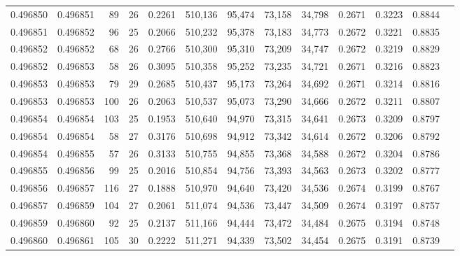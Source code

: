 \begin{tabular}{rrrrrrrrrrrrr}
0.496850 & 0.496851 &  89 &  26 &                                     0.2261 & 510,136 &  95,474 &  73,158 &  34,798 & 0.2671 & 0.3223 & 0.8844 \\
0.496851 & 0.496852 &  96 &  25 &                                     0.2066 & 510,232 &  95,378 &  73,183 &  34,773 & 0.2672 & 0.3221 & 0.8835 \\
0.496852 & 0.496852 &  68 &  26 &                                     0.2766 & 510,300 &  95,310 &  73,209 &  34,747 & 0.2672 & 0.3219 & 0.8829 \\
0.496852 & 0.496853 &  58 &  26 &                                     0.3095 & 510,358 &  95,252 &  73,235 &  34,721 & 0.2671 & 0.3216 & 0.8823 \\
0.496853 & 0.496853 &  79 &  29 &                                     0.2685 & 510,437 &  95,173 &  73,264 &  34,692 & 0.2671 & 0.3214 & 0.8816 \\
0.496853 & 0.496853 & 100 &  26 &                                     0.2063 & 510,537 &  95,073 &  73,290 &  34,666 & 0.2672 & 0.3211 & 0.8807 \\
0.496854 & 0.496854 & 103 &  25 &                                     0.1953 & 510,640 &  94,970 &  73,315 &  34,641 & 0.2673 & 0.3209 & 0.8797 \\
0.496854 & 0.496854 &  58 &  27 &                                     0.3176 & 510,698 &  94,912 &  73,342 &  34,614 & 0.2672 & 0.3206 & 0.8792 \\
0.496854 & 0.496855 &  57 &  26 &                                     0.3133 & 510,755 &  94,855 &  73,368 &  34,588 & 0.2672 & 0.3204 & 0.8786 \\
0.496855 & 0.496856 &  99 &  25 &                                     0.2016 & 510,854 &  94,756 &  73,393 &  34,563 & 0.2673 & 0.3202 & 0.8777 \\
0.496856 & 0.496857 & 116 &  27 &                                     0.1888 & 510,970 &  94,640 &  73,420 &  34,536 & 0.2674 & 0.3199 & 0.8767 \\
0.496857 & 0.496859 & 104 &  27 &                                     0.2061 & 511,074 &  94,536 &  73,447 &  34,509 & 0.2674 & 0.3197 & 0.8757 \\
0.496859 & 0.496860 &  92 &  25 &                                     0.2137 & 511,166 &  94,444 &  73,472 &  34,484 & 0.2675 & 0.3194 & 0.8748 \\
0.496860 & 0.496861 & 105 &  30 &                                     0.2222 & 511,271 &  94,339 &  73,502 &  34,454 & 0.2675 & 0.3191 & 0.8739 \\

\end{tabular}
